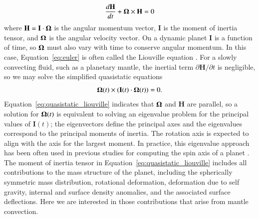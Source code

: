 \documentclass[preprint,12pt,authoryear]{elsarticle}
\newcommand{\mitbf}[1]{\hbox{\mathversion{bold}$#1$}}
\begin{document}
\begin{equation}
\frac{d \mathbf{H}}{dt} + \mitbf{\Omega} \times \mathbf{H} = 0
\label{eq:euler}
\end{equation}
where $\mathbf{H} = \mathbf{I} \cdot \mitbf{\Omega}$ is the angular momentum vector, $\mathbf{I}$ is the moment of inertia tensor, and $\mitbf{\Omega}$ is the angular velocity vector.
On a dynamic planet $\mathbf{I}$ is a function of time, so $\mitbf{\Omega}$ must also vary with time to conserve angular momentum.
In this case, Equation~\eqref{eq:euler} is often called the Liouville equation \citep[e.g.][]{munk1960rotation}.
For a slowly convecting fluid, such as a planetary mantle, the inertial term $\partial \mathbf{H} / \partial t$ is negligible, so we may solve the simplified quasistatic equations
\begin{equation}
\mitbf{\Omega } (t)\times ( \mathbf{I}(t) \cdot \mitbf{\Omega }(t) ) = 0.
\label{eq:quasistatic_liouville}
\end{equation}
Equation~\eqref{eq:quasistatic_liouville} indicates that $\mitbf{\Omega}$ and $\mathbf{H}$ are parallel, so a solution for $\mitbf{\Omega}(t)$ is equivalent to solving an eigenvalue problem for the principal values of $\mathbf{I}(t)$;  the eigenvectors define the principal axes and the eigenvalues correspond to the principal moments of inertia. The rotation axis is expected to align with the axis for the largest moment.  
In practice, this eigenvalue approach has been often used in previous studies for computing the spin axis of a planet \citep[e.g.][]{steinberger1997changes, roberts2007cause}.
The moment of inertia tensor in Equation~\eqref{eq:quasistatic_liouville} includes all contributions to the mass structure
of the planet, including the spherically symmetric mass distribution, rotational deformation, deformation due to self gravity, internal and surface density anomalies, and the associated surface deflections.
Here we are interested in those contributions that arise from mantle convection.
\end{document}
